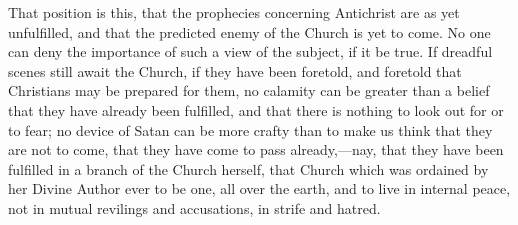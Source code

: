 That position is this, that the prophecies concerning Antichrist
are as yet unfulfilled, and that the predicted enemy of the Church is
yet to come. No one can deny the importance of such a view of the
subject, if it be true. If dreadful scenes still await the Church, if
they have been foretold, and foretold that Christians may be prepared
for them, no calamity can be greater than a belief that they have
already been fulfilled, and that there is nothing to look out for or
to fear; no device of Satan can be more crafty than to make us
think that they are not to come, that they have come to pass already,—nay,
that they have been fulfilled in a branch of the Church herself, that
Church which was ordained by her Divine Author ever to be one, all
over the earth, and to live in internal peace, not in mutual revilings
and accusations, in strife and hatred.

